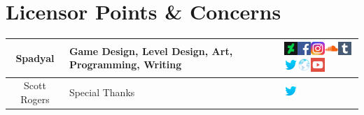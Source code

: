 \documentclass[12pt]{article}
\begin{document}
\section{Licensor Points \& Concerns}
\begin{center}

\tablelasttail{
\\
}

\begin{supertabular}{c|x{2in}|x{1.75in}}
\hline
Spadyal & Game Design, Level Design, Art, Programming, Writing & \href{http://staream.deviantart.com/}{\includegraphics[width=0.2in]{deviantart}}\href{https://www.facebook.com/spadyalofficial/}{\includegraphics[width=0.2in]{facebook}}\href{}{\includegraphics[width=0.2in]{instagram}}\href{https://soundcloud.com/spadyalofficial}{\includegraphics[width=0.2in]{soundcloud}}\href{}{\includegraphics[width=0.2in]{tumblr}}\href{https://twitter.com/Spadyal1}{\includegraphics[width=0.2in]{twitter}}\href{}{\includegraphics[width=0.2in]{www}}\href{}{\includegraphics[width=0.2in]{youtube}} \\ \hline
Scott Rogers & Special Thanks & \href{https://twitter.com/mightybedbug?ref_src=twsrc\%5Egoogle\%7Ctwcamp\%5Eserp\%7Ctwgr\%5Eauthor}{\includegraphics[width=0.2in]{twitter}} %

\end{supertabular}
\end{center}
\end{document}
